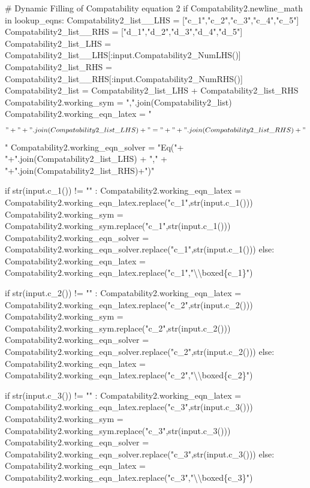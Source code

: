 \documentclass[
  letterpaper,
  DIV=11,
  numbers=noendperiod]{scrreprt}
\newenvironment{Shaded}{\begin{snugshade}}{\end{snugshade}}
\newcommand{\NormalTok}[1]{\textcolor[rgb]{0.00,0.23,0.31}{#1}}
\begin{document}
\begin{Shaded}
\begin{Highlighting}[]
\NormalTok{\# Dynamic Filling of Compatability equation 2}
\NormalTok{        if Compatability2.newline\_math in lookup\_eqns:}
\NormalTok{            Compatability2\_list\_\_LHS = ["c\_1","c\_2","c\_3","c\_4","c\_5"]}
\NormalTok{            Compatability2\_list\_\_RHS = ["d\_1","d\_2","d\_3","d\_4","d\_5"]}
\NormalTok{            Compatability2\_list\_LHS = Compatability2\_list\_\_LHS[:input.Compatability2\_NumLHS()]}
\NormalTok{            Compatability2\_list\_RHS = Compatability2\_list\_\_RHS[:input.Compatability2\_NumRHS()]}
\NormalTok{            Compatability2\_list = Compatability2\_list\_LHS + Compatability2\_list\_RHS}
\NormalTok{            Compatability2.working\_sym = ",".join(Compatability2\_list)}
\NormalTok{            Compatability2.working\_eqn\_latex = "$$" + "+".join(Compatability2\_list\_LHS) + "=" + "+".join(Compatability2\_list\_RHS)+"$$"}
\NormalTok{            Compatability2.working\_eqn\_solver = "Eq("+ "+".join(Compatability2\_list\_LHS) + "," + "+".join(Compatability2\_list\_RHS)+")"}
            
\NormalTok{            if str(input.c\_1()) != "" : }
\NormalTok{                Compatability2.working\_eqn\_latex = Compatability2.working\_eqn\_latex.replace("c\_1",str(input.c\_1()))}
\NormalTok{                Compatability2.working\_sym = Compatability2.working\_sym.replace("c\_1",str(input.c\_1()))}
\NormalTok{                Compatability2.working\_eqn\_solver = Compatability2.working\_eqn\_solver.replace("c\_1",str(input.c\_1()))}
\NormalTok{            else:}
\NormalTok{                Compatability2.working\_eqn\_latex = Compatability2.working\_eqn\_latex.replace("c\_1","\textbackslash{}\textbackslash{}boxed\{c\_1\}")}
            
\NormalTok{            if str(input.c\_2()) != "" : }
\NormalTok{                Compatability2.working\_eqn\_latex = Compatability2.working\_eqn\_latex.replace("c\_2",str(input.c\_2()))}
\NormalTok{                Compatability2.working\_sym = Compatability2.working\_sym.replace("c\_2",str(input.c\_2()))}
\NormalTok{                Compatability2.working\_eqn\_solver = Compatability2.working\_eqn\_solver.replace("c\_2",str(input.c\_2()))}
\NormalTok{            else:}
\NormalTok{                Compatability2.working\_eqn\_latex = Compatability2.working\_eqn\_latex.replace("c\_2","\textbackslash{}\textbackslash{}boxed\{c\_2\}")}
            
\NormalTok{            if str(input.c\_3()) != "" : }
\NormalTok{                Compatability2.working\_eqn\_latex = Compatability2.working\_eqn\_latex.replace("c\_3",str(input.c\_3()))}
\NormalTok{                Compatability2.working\_sym = Compatability2.working\_sym.replace("c\_3",str(input.c\_3()))}
\NormalTok{                Compatability2.working\_eqn\_solver = Compatability2.working\_eqn\_solver.replace("c\_3",str(input.c\_3()))}
\NormalTok{            else:}
\NormalTok{                Compatability2.working\_eqn\_latex = Compatability2.working\_eqn\_latex.replace("c\_3","\textbackslash{}\textbackslash{}boxed\{c\_3\}")}
            

\end{Highlighting}
\end{Shaded}
\end{document}

